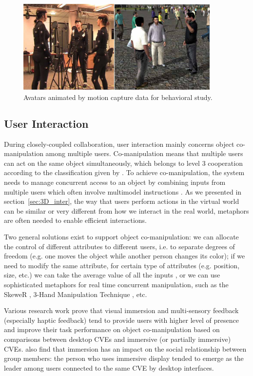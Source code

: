 \begin{figure}[htb]
  \centering
  \includegraphics[width=0.9\textwidth]{figures/ch1/commu_study}
  \caption{\label{fig:1_commu} Avatars animated by motion capture data for behavioral study.}
\end{figure}

\subsection{User Interaction}
During closely-coupled collaboration, user interaction mainly concerns object co-manipulation among multiple users. Co-manipulation means that multiple users can act on the same object simultaneously, which belongs to level 3 cooperation according to the classification given by \citet{Margery1999Framework}. To achieve co-manipulation, the system needs to manage concurrent access to an object by combining inputs from multiple users which often involve multimodel instructions \citep{Martin2011Reconfigurable}. As we presented in section~\ref{sec:3D_inter}, the way that users perform actions in the virtual world can be similar or very different from how we interact in the real world, metaphors are often needed to enable efficient interactions.

Two general solutions exist to support object co-manipulation: we can allocate the control of different attributes to different users, i.e. to separate degrees of freedom \citep{Pinho2002Cooperative} (e.g. one moves the object while another person changes its color); if we need to modify the same attribute, for certain type of attributes (e.g. position, size, etc.) we can take the average value of all the inputs \citep{Ruddle2002Symmetric}, or we can use sophisticated metaphors for real time concurrent manipulation, such as the SkeweR \citep{Duval2006Skewer}, 3-Hand Manipulation Technique \citep{Aguerreche2009Three}, etc.

Various research work prove that visual immersion \citep{Schroeder2001NIS, Roberts2003Gazebo, Narayan2005Quantifying} and multi-sensory feedback (especially haptic feedback) \citep{Nam2008Roles, Oguz2010Haptic} tend to provide users with higher level of presence and improve their task performance on object co-manipulation based on comparisons between desktop CVEs and immersive (or partially immersive) CVEs. \citet{Slater2000Small} also find that immersion has an impact on the social relationship between group members: the person who uses immersive display tended to emerge as the leader among users connected to the same CVE by desktop interfaces.


